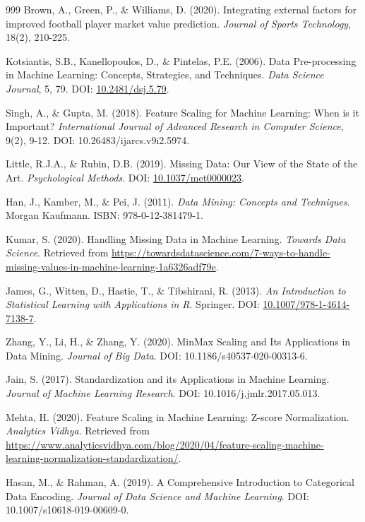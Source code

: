 \documentclass[12pt, a4paper,oneside]{book}
\numberwithin{equation}{section}
\begin{document}
\begin{thebibliography}{999}
Brown, A., Green, P., \& Williams, D. (2020). Integrating external factors for improved football player market value prediction. \textit{Journal of Sports Technology}, 18(2), 210-225.

Kotsiantis, S.B., Kanellopoulos, D., \& Pintelas, P.E. (2006). Data Pre-processing in Machine Learning: Concepts, Strategies, and Techniques. \textit{Data Science Journal}, 5, 79. DOI: \href{https://doi.org/10.2481/dsj.5.79}{10.2481/dsj.5.79}.

Singh, A., \& Gupta, M. (2018). Feature Scaling for Machine Learning: When is it Important? \textit{International Journal of Advanced Research in Computer Science}, 9(2), 9-12. DOI: 10.26483/ijarcs.v9i2.5974.

Little, R.J.A., \& Rubin, D.B. (2019). Missing Data: Our View of the State of the Art. \textit{Psychological Methods}. DOI: \href{https://doi.org/10.1037/met0000023}{10.1037/met0000023}.

Han, J., Kamber, M., \& Pei, J. (2011). \textit{Data Mining: Concepts and Techniques}. Morgan Kaufmann. ISBN: 978-0-12-381479-1.

Kumar, S. (2020). Handling Missing Data in Machine Learning. \textit{Towards Data Science}. Retrieved from \url{https://towardsdatascience.com/7-ways-to-handle-missing-values-in-machine-learning-1a6326adf79e}{}.

James, G., Witten, D., Hastie, T., \& Tibshirani, R. (2013). \textit{An Introduction to Statistical Learning with Applications in R}. Springer. DOI: \href{https://doi.org/10.1007/978-1-4614-7138-7}{10.1007/978-1-4614-7138-7}.

Zhang, Y., Li, H., \& Zhang, Y. (2020). MinMax Scaling and Its Applications in Data Mining. \textit{Journal of Big Data}. DOI: 10.1186/s40537-020-00313-6. 

Jain, S. (2017). Standardization and its Applications in Machine Learning. \textit{Journal of Machine Learning Research}. DOI: 10.1016/j.jmlr.2017.05.013. 

Mehta, H. (2020). Feature Scaling in Machine Learning: Z-score Normalization. \textit{Analytics Vidhya}. Retrieved from \url{https://www.analyticsvidhya.com/blog/2020/04/feature-scaling-machine-learning-normalization-standardization/}{}. 

Hasan, M., \& Rahman, A. (2019). A Comprehensive Introduction to Categorical Data Encoding. \textit{Journal of Data Science and Machine Learning}. DOI: 10.1007/s10618-019-00609-0.


\end{thebibliography}
\end{document}
